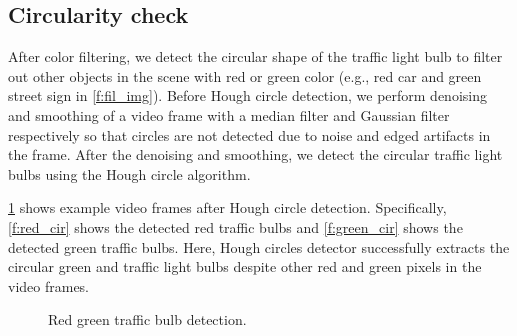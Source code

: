 \subsection{Circularity check}
After color filtering, we detect the circular shape of the traffic light bulb to filter out other objects in the scene with red or green color (e.g., red car and green street sign in \ref{f:fil_img}).
Before Hough circle detection, we perform denoising and smoothing of a video frame with a median filter and Gaussian filter respectively so that circles are not detected due to noise and edged artifacts in the frame.
After the denoising and smoothing, we detect the circular traffic light bulbs using the Hough circle algorithm.

\ref{f:cir_img} shows example video frames after Hough circle detection.
Specifically, \ref{f:red_cir} shows the detected red traffic bulbs and \ref{f:green_cir} shows the detected green traffic bulbs.
Here, Hough circles detector successfully extracts the circular green and traffic light bulbs despite other red and green pixels in the video frames.


\begin{figure}[!ht]
\centering
{}
\hfill
{}
\caption{Red green traffic bulb detection.}
\label{f:cir_img}
\end{figure}


